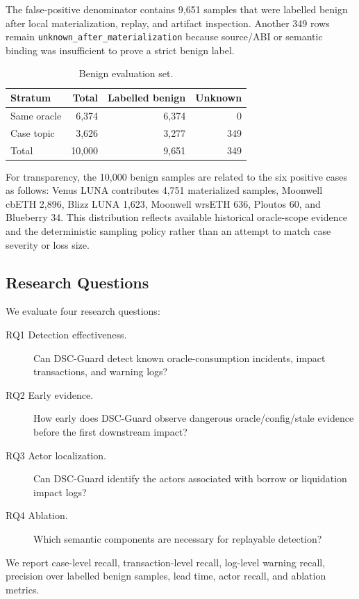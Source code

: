 \documentclass[final,5p]{elsarticle}
\newcommand{\tool}{DSC-Guard\xspace}
\newcommand{\code}[1]{\texttt{#1}}
\begin{document}
The false-positive denominator contains 9,651 samples that were labelled benign after local materialization, replay, and artifact inspection.
Another 349 rows remain \code{unknown\_after\_materialization} because source/ABI or semantic binding was insufficient to prove a strict benign label.

\begin{table}[t]
\centering
\caption{Benign evaluation set.}
\label{tab:benign}
\small
\begin{tabular}{lrrr}
\toprule
Stratum & Total & Labelled benign & Unknown \\
\midrule
Same oracle & 6,374 & 6,374 & 0 \\
Case topic & 3,626 & 3,277 & 349 \\
\midrule
Total & 10,000 & 9,651 & 349 \\
\bottomrule
\end{tabular}
\end{table}

For transparency, the 10,000 benign samples are related to the six positive cases as follows: Venus LUNA contributes 4,751 materialized samples, Moonwell cbETH 2,896, Blizz LUNA 1,623, Moonwell wrsETH 636, Ploutos 60, and Blueberry 34.
This distribution reflects available historical oracle-scope evidence and the deterministic sampling policy rather than an attempt to match case severity or loss size.

\subsection{Research Questions}

We evaluate four research questions:
\begin{description}
    \item[RQ1 Detection effectiveness.] Can \tool detect known oracle-consumption incidents, impact transactions, and warning logs?
    \item[RQ2 Early evidence.] How early does \tool observe dangerous oracle/config/stale evidence before the first downstream impact?
    \item[RQ3 Actor localization.] Can \tool identify the actors associated with borrow or liquidation impact logs?
    \item[RQ4 Ablation.] Which semantic components are necessary for replayable detection?
\end{description}

We report case-level recall, transaction-level recall, log-level warning recall, precision over labelled benign samples, lead time, actor recall, and ablation metrics.
\end{document}
